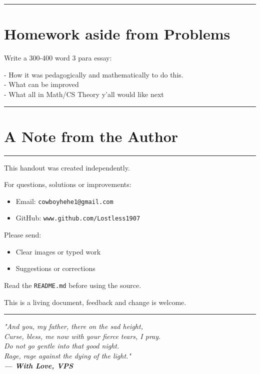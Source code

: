 \documentclass[11pt]{article}
\newcommand{\sepline}{
    \vspace{0.5em}
    \hrule
    \vspace{1em}
}
\begin{document}
\sepline

\section{Homework aside from Problems}

Write a 300-400 word 3 para essay:

- How it was pedagogically and mathematically to do this. \\
- What can be improved \\
- What all in Math/CS Theory y'all would like next \\

\sepline

\section*{A Note from the Author}
\sepline

This handout was created independently.

For questions, solutions or improvements:

\begin{itemize}
\item Email: \texttt{cowboyhehe1@gmail.com}
\item GitHub: \texttt{www.github.com/Lostless1907}
\end{itemize}

Please send:
\begin{itemize}
\item Clear images or typed work
\item Suggestions or corrections
\end{itemize}

Read the \texttt{README.md} before using the source.

This is a living document, feedback and change is welcome.

\sepline

\textit{"And you, my father, there on the sad height, \\
Curse, bless, me now with your fierce tears, I pray. \\
Do not go gentle into that good night. \\
Rage, rage against the dying of the light." \\
\textbf{— With Love, VPS}}
\end{document}
